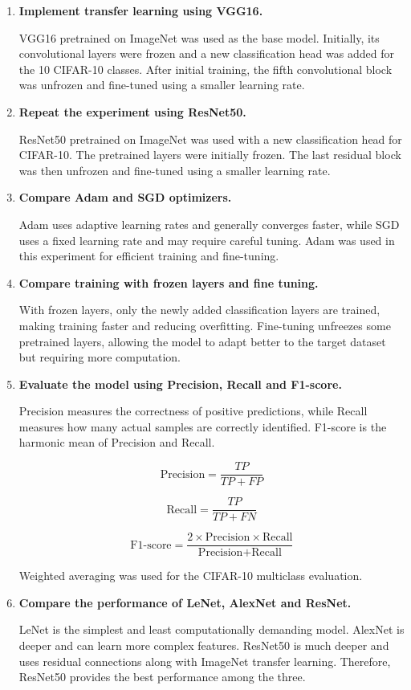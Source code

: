\documentclass[11pt]{article}
\begin{document}
\begin{enumerate}

\item \textbf{Implement transfer learning using VGG16.}

VGG16 pretrained on ImageNet was used as the base model. Initially, its 
convolutional layers were frozen and a new classification head was added 
for the 10 CIFAR-10 classes. After initial training, the fifth convolutional 
block was unfrozen and fine-tuned using a smaller learning rate.

\item \textbf{Repeat the experiment using ResNet50.}

ResNet50 pretrained on ImageNet was used with a new classification head for 
CIFAR-10. The pretrained layers were initially frozen. The last residual 
block was then unfrozen and fine-tuned using a smaller learning rate.

\item \textbf{Compare Adam and SGD optimizers.}

Adam uses adaptive learning rates and generally converges faster, while SGD 
uses a fixed learning rate and may require careful tuning. Adam was used in 
this experiment for efficient training and fine-tuning.

\item \textbf{Compare training with frozen layers and fine tuning.}

With frozen layers, only the newly added classification layers are trained, 
making training faster and reducing overfitting. Fine-tuning unfreezes some 
pretrained layers, allowing the model to adapt better to the target dataset 
but requiring more computation.

\item \textbf{Evaluate the model using Precision, Recall and F1-score.}

Precision measures the correctness of positive predictions, while Recall 
measures how many actual samples are correctly identified. F1-score is the 
harmonic mean of Precision and Recall.

\[
\text{Precision}=\frac{TP}{TP+FP}
\]

\[
\text{Recall}=\frac{TP}{TP+FN}
\]

\[
\text{F1-score}=
\frac{2\times\text{Precision}\times\text{Recall}}
{\text{Precision}+\text{Recall}}
\]

Weighted averaging was used for the CIFAR-10 multiclass evaluation.

\item \textbf{Compare the performance of LeNet, AlexNet and ResNet.}

LeNet is the simplest and least computationally demanding model. AlexNet is 
deeper and can learn more complex features. ResNet50 is much deeper and uses 
residual connections along with ImageNet transfer learning. Therefore, 
ResNet50 provides the best performance among the three.

\end{enumerate}
\end{document}
